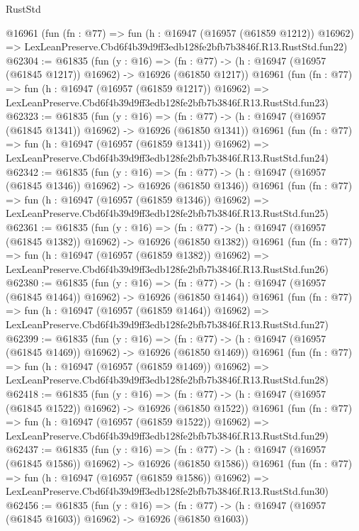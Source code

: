 \begin{lexlean}{RustStd}
\begin{coremodule}
    @16961
    (fun (fn : @77) =>
    fun (h : @16947 (@16957 (@61859 @1212)) @16962) =>
    LexLeanPreserve.Cbd6f4b39d9ff3edb128fe2bfb7b3846f.R13.RustStd.fun22)
@62304 := @61835
    (fun (y : @16) =>
    (fn : @77) -> (h : @16947 (@16957 (@61845 @1217)) @16962) -> @16926 (@61850 @1217))
    @16961
    (fun (fn : @77) =>
    fun (h : @16947 (@16957 (@61859 @1217)) @16962) =>
    LexLeanPreserve.Cbd6f4b39d9ff3edb128fe2bfb7b3846f.R13.RustStd.fun23)
@62323 := @61835
    (fun (y : @16) =>
    (fn : @77) -> (h : @16947 (@16957 (@61845 @1341)) @16962) -> @16926 (@61850 @1341))
    @16961
    (fun (fn : @77) =>
    fun (h : @16947 (@16957 (@61859 @1341)) @16962) =>
    LexLeanPreserve.Cbd6f4b39d9ff3edb128fe2bfb7b3846f.R13.RustStd.fun24)
@62342 := @61835
    (fun (y : @16) =>
    (fn : @77) -> (h : @16947 (@16957 (@61845 @1346)) @16962) -> @16926 (@61850 @1346))
    @16961
    (fun (fn : @77) =>
    fun (h : @16947 (@16957 (@61859 @1346)) @16962) =>
    LexLeanPreserve.Cbd6f4b39d9ff3edb128fe2bfb7b3846f.R13.RustStd.fun25)
@62361 := @61835
    (fun (y : @16) =>
    (fn : @77) -> (h : @16947 (@16957 (@61845 @1382)) @16962) -> @16926 (@61850 @1382))
    @16961
    (fun (fn : @77) =>
    fun (h : @16947 (@16957 (@61859 @1382)) @16962) =>
    LexLeanPreserve.Cbd6f4b39d9ff3edb128fe2bfb7b3846f.R13.RustStd.fun26)
@62380 := @61835
    (fun (y : @16) =>
    (fn : @77) -> (h : @16947 (@16957 (@61845 @1464)) @16962) -> @16926 (@61850 @1464))
    @16961
    (fun (fn : @77) =>
    fun (h : @16947 (@16957 (@61859 @1464)) @16962) =>
    LexLeanPreserve.Cbd6f4b39d9ff3edb128fe2bfb7b3846f.R13.RustStd.fun27)
@62399 := @61835
    (fun (y : @16) =>
    (fn : @77) -> (h : @16947 (@16957 (@61845 @1469)) @16962) -> @16926 (@61850 @1469))
    @16961
    (fun (fn : @77) =>
    fun (h : @16947 (@16957 (@61859 @1469)) @16962) =>
    LexLeanPreserve.Cbd6f4b39d9ff3edb128fe2bfb7b3846f.R13.RustStd.fun28)
@62418 := @61835
    (fun (y : @16) =>
    (fn : @77) -> (h : @16947 (@16957 (@61845 @1522)) @16962) -> @16926 (@61850 @1522))
    @16961
    (fun (fn : @77) =>
    fun (h : @16947 (@16957 (@61859 @1522)) @16962) =>
    LexLeanPreserve.Cbd6f4b39d9ff3edb128fe2bfb7b3846f.R13.RustStd.fun29)
@62437 := @61835
    (fun (y : @16) =>
    (fn : @77) -> (h : @16947 (@16957 (@61845 @1586)) @16962) -> @16926 (@61850 @1586))
    @16961
    (fun (fn : @77) =>
    fun (h : @16947 (@16957 (@61859 @1586)) @16962) =>
    LexLeanPreserve.Cbd6f4b39d9ff3edb128fe2bfb7b3846f.R13.RustStd.fun30)
@62456 := @61835
    (fun (y : @16) =>
    (fn : @77) -> (h : @16947 (@16957 (@61845 @1603)) @16962) -> @16926 (@61850 @1603))

\end{coremodule}
\end{lexlean}
